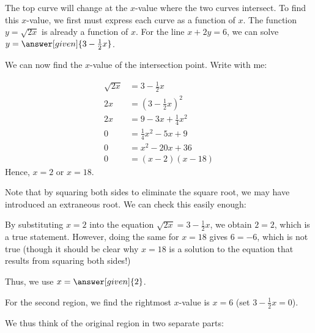 \documentclass{ximera}
\begin{document}
\begin{example}

The top curve will change at the $x$-value where the two curves intersect.  To find this $x$-value, we first must express each curve as a function of $x$.  The function $y=\sqrt{2x}$ is already a function of $x$.  For the line $x+2y=6$, we can solve $y=\answer[given]{3- \frac{1}{2}x}$.

We can now find the $x$-value of the intersection point. Write with me:

\begin{align*}
\sqrt{2x} &= 3 -\frac{1}{2}x \\
2x &= \left(3 -\frac{1}{2}x\right)^2 \\
2x&= 9-3x+\frac{1}{4} x^2 \\
0 &= \frac{1}{4} x^2 -5x+9  \\
0 &= x^2 -20x+36  \\
0 &= (x-2)(x-18) 
\end{align*}
Hence, $x=2$ or $x=18$.  

Note that by squaring both sides to eliminate the square root, we may have introduced an extraneous root.  We can check this easily enough:

By substituting $x=2$ into the equation $\sqrt{2x} = 3-\frac{1}{2}x$, we obtain $2=2$, which is a true statement.  However, doing the same for $x=18$ gives $6 = -6$, which is not true (though it should be clear why $x=18$ is a solution to the equation that results from squaring both sides!) 

Thus, we use $x=\answer[given]{2}$.  

For the second region, we find the rightmost $x$-value is $x=6$ (set $3-\frac{1}{2}x=0$).

We thus think of the original region in two separate parts:

   \begin{image}
\end{image}
\end{example}
\end{document}
